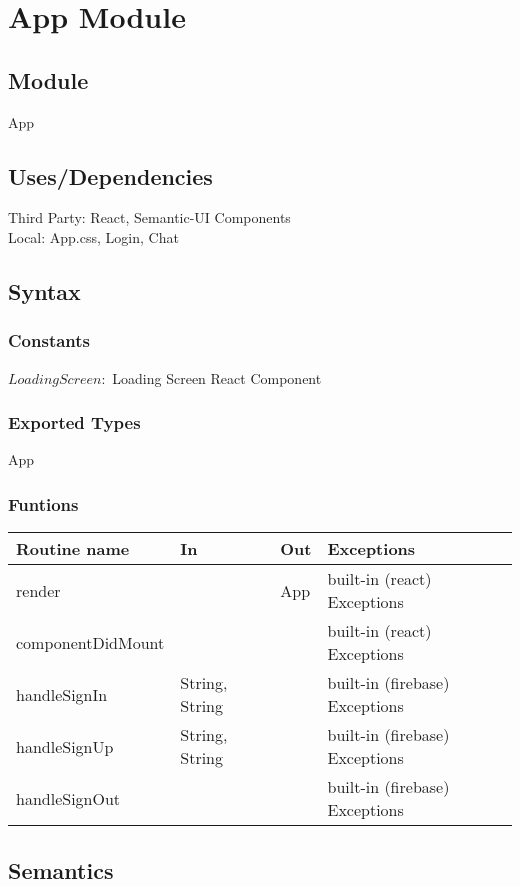 \documentclass[12pt, titlepage]{article}
\begin{document}
\section* {App Module}

\subsection*{Module}

App

\subsection* {Uses/Dependencies}
Third Party: React, Semantic-UI Components\\
Local: App.css, Login, Chat

\subsection* {Syntax}

\subsubsection* {Constants} 
$LoadingScreen:$ Loading Screen React Component
\subsubsection* {Exported Types} App
\subsubsection* {Funtions}
\begin{tabular}{| l | l | l | l |}
\hline
\textbf{Routine name} & \textbf{In} & \textbf{Out} & \textbf{Exceptions}\\
\hline
render & ~ & App & built-in (react) Exceptions\\
\hline
componentDidMount & ~ & ~ & built-in (react) Exceptions\\
\hline
handleSignIn & String, String & ~ & built-in (firebase) Exceptions\\
\hline
handleSignUp & String, String & ~ & built-in (firebase) Exceptions\\
\hline
handleSignOut & ~ & ~ & built-in (firebase) Exceptions\\
\hline
\end{tabular}
\subsection* {Semantics}
\end{document}
